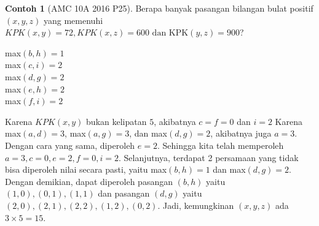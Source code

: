 \documentclass[aspectratio=169]{beamer}
\theoremstyle{definition}
\newtheorem{contoh}{Contoh}
\begin{document}
\begin{frame}{\insertsection}
  \begin{contoh}[AMC 10A 2016 P25]
    Berapa banyak pasangan bilangan bulat positif $(x,y,z)$ yang memenuhi  $KPK(x,y) = 72, KPK(x,z) = 600 \text{ dan KPK}(y,z)=900$?
  \end{contoh}
\end{frame}
\begin{frame}{\insertsection}
  \begin{center}
    max$(b,h)=1$ \\
    max$(c,i)=2$ \\
    max$(d,g)=2$ \\
    max$(e,h)=2$ \\
    max$(f,i)=2$
  \end{center}
  Karena $KPK(x,y)$ bukan kelipatan $5$, akibatnya $c=f=0$ dan $i=2$ Karena max$(a,d)=3$, max$(a,g)=3$, dan max$(d,g)=2$, akibatnya juga $a=3$. Dengan cara yang sama, diperoleh $e=2$. Sehingga kita telah memperoleh $a=3, c=0, e=2, f=0, i=2.$ Selanjutnya, terdapat 2 persamaan yang tidak bisa diperoleh nilai secara pasti, yaitu max$(b,h)=1$ dan max$(d,g)=2$. Dengan demikian, dapat diperoleh pasangan $(b,h)$ yaitu $(1,0),(0,1),(1,1)$ dan  pasangan $(d,g)$ yaitu $(2,0),(2,1),(2,2),(1,2),(0,2)$. Jadi, kemungkinan $(x,y,z)$ ada $3 \times 5=15.$
\end{frame}
\end{document}
